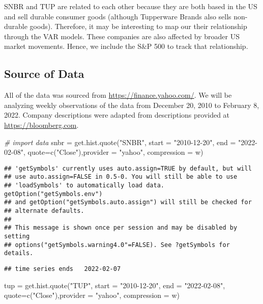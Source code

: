 \documentclass[
  10.5pt,
]{article}
\newenvironment{Shaded}{\begin{snugshade}}{\end{snugshade}}
\newcommand{\AttributeTok}[1]{\textcolor[rgb]{0.77,0.63,0.00}{#1}}
\newcommand{\CommentTok}[1]{\textcolor[rgb]{0.56,0.35,0.01}{\textit{#1}}}
\newcommand{\FunctionTok}[1]{\textcolor[rgb]{0.00,0.00,0.00}{#1}}
\newcommand{\NormalTok}[1]{#1}
\newcommand{\OtherTok}[1]{\textcolor[rgb]{0.56,0.35,0.01}{#1}}
\newcommand{\StringTok}[1]{\textcolor[rgb]{0.31,0.60,0.02}{#1}}
\begin{document}
SNBR and TUP are related to each other because they are both based in
the US and sell durable consumer goods (although Tupperware Brands also
sells non-durable goods). Therefore, it may be interesting to map our
their relationship through the VAR models. These companies are also
affected by broader US market movements. Hence, we include the S\&P 500
to track that relationship.

\hypertarget{source-of-data}{%
\subsection{Source of Data}\label{source-of-data}}

All of the data was sourced from \url{https://finance.yahoo.com/}. We
will be analyzing weekly observations of the data from December 20, 2010
to February 8, 2022. Company descriptions were adapted from descriptions
provided at \url{https://bloomberg.com}.

\begin{Shaded}
\begin{Highlighting}[]
\CommentTok{\# import data}
\NormalTok{snbr }\OtherTok{=} \FunctionTok{get.hist.quote}\NormalTok{(}\StringTok{"SNBR"}\NormalTok{, }\AttributeTok{start =} \StringTok{"2010{-}12{-}20"}\NormalTok{, }\AttributeTok{end =} \StringTok{"2022{-}02{-}08"}\NormalTok{,}
                     \AttributeTok{quote=}\FunctionTok{c}\NormalTok{(}\StringTok{"Close"}\NormalTok{),}\AttributeTok{provider =} \StringTok{"yahoo"}\NormalTok{,}
                     \AttributeTok{compression =} \StringTok{\textquotesingle{}w\textquotesingle{}}\NormalTok{)}
\end{Highlighting}
\end{Shaded}

\begin{verbatim}
## 'getSymbols' currently uses auto.assign=TRUE by default, but will
## use auto.assign=FALSE in 0.5-0. You will still be able to use
## 'loadSymbols' to automatically load data. getOption("getSymbols.env")
## and getOption("getSymbols.auto.assign") will still be checked for
## alternate defaults.
## 
## This message is shown once per session and may be disabled by setting 
## options("getSymbols.warning4.0"=FALSE). See ?getSymbols for details.
\end{verbatim}

\begin{verbatim}
## time series ends   2022-02-07
\end{verbatim}

\begin{Shaded}
\begin{Highlighting}[]
\NormalTok{tup }\OtherTok{=} \FunctionTok{get.hist.quote}\NormalTok{(}\StringTok{"TUP"}\NormalTok{, }\AttributeTok{start =} \StringTok{"2010{-}12{-}20"}\NormalTok{, }\AttributeTok{end =} \StringTok{"2022{-}02{-}08"}\NormalTok{,}
                       \AttributeTok{quote=}\FunctionTok{c}\NormalTok{(}\StringTok{"Close"}\NormalTok{),}\AttributeTok{provider =} \StringTok{"yahoo"}\NormalTok{,}
                     \AttributeTok{compression =} \StringTok{\textquotesingle{}w\textquotesingle{}}\NormalTok{)}
\end{Highlighting}
\end{Shaded}
\end{document}
